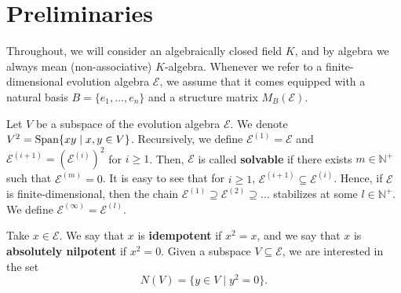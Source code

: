 \documentclass[11pt]{article}
\theoremstyle{definition}
\numberwithin{equation}{section}
\begin{document}
\section{Preliminaries}
\begin{humanblock}
Throughout, we will consider an algebraically closed field $K$, and by algebra we always mean (non-associative) $K$-algebra. Whenever we refer to a finite-dimensional evolution algebra $\mathcal E$, we assume that it comes equipped with a natural basis $B = \{e_1,\ldots, e_n\}$ and a structure matrix $M_B(\mathcal E)$. 


Let $V$ be a subspace of the evolution algebra $\mathcal E$. We denote $V^2 = \operatorname{Span}\{xy\mid x,y\in V\}$. Recursively, we define $\mathcal E^{(1)} = \mathcal E$ and $\mathcal E^{(i+1)}=(\mathcal E^{(i)})^2$ for $i\geq 1$. Then, $\mathcal E$ is called \textbf{solvable} if there exists $m\in \mathbb N^+$ such that $\mathcal E^{(m)} = 0$.  It is easy to see that for $i\geq 1$, $\mathcal E^{(i+1)}\subseteq \mathcal E^{(i)}$. Hence, if $\mathcal E$ is finite-dimensional, then the chain $\mathcal E^{(1)}\supseteq \mathcal E^{(2)}\supseteq\ldots$ stabilizes at some $l\in \mathbb N^+$. We define $\mathcal E^{(\infty)} = \mathcal E^{(l)}$. 

Take $x\in \mathcal E$. We say that $x$ is \textbf{idempotent} if $x^2=x$, and we say that $x$ is \textbf{absolutely nilpotent} if $x^2 = 0$. Given a subspace $V\subseteq \mathcal E$, we are interested in the set \[N(V) = \{y\in V\mid y^2 = 0\}. \]


\end{humanblock}
\end{document}
